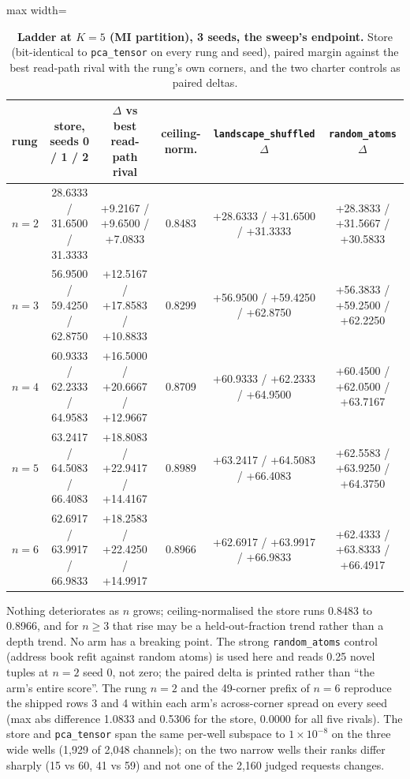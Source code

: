 \documentclass{article} %
\newcommand{\sci}[2]{\ensuremath{#1\times10^{#2}}}
\begin{document}
\begin{table}[h]
\centering\small
\caption{\textbf{Ladder at $K=5$ (MI partition), 3 seeds, the sweep's endpoint.} Store
(bit-identical to \texttt{pca\_tensor} on every rung and seed), paired margin against the best
read-path rival with the rung's own corners, and the two charter controls as paired deltas.}
\label{tab:k5}
\setlength{\tabcolsep}{2.4pt}
\begin{adjustbox}{max width=\linewidth}\begin{tabular}{lccccc}
\toprule
rung & store, seeds 0 / 1 / 2 & $\Delta$ vs best read-path rival & ceiling-norm. & \texttt{landscape\_shuffled} $\Delta$ & \texttt{random\_atoms} $\Delta$ \\
\midrule
$n=2$ & 28.6333 / 31.6500 / 31.3333 & +9.2167 / +9.6500 / +7.0833 & 0.8483 & +28.6333 / +31.6500 / +31.3333 & +28.3833 / +31.5667 / +30.5833 \\
$n=3$ & 56.9500 / 59.4250 / 62.8750 & +12.5167 / +17.8583 / +10.8833 & 0.8299 & +56.9500 / +59.4250 / +62.8750 & +56.3833 / +59.2500 / +62.2250 \\
$n=4$ & 60.9333 / 62.2333 / 64.9583 & +16.5000 / +20.6667 / +12.9667 & 0.8709 & +60.9333 / +62.2333 / +64.9500 & +60.4500 / +62.0500 / +63.7167 \\
$n=5$ & 63.2417 / 64.5083 / 66.4083 & +18.8083 / +22.9417 / +14.4167 & 0.8989 & +63.2417 / +64.5083 / +66.4083 & +62.5583 / +63.9250 / +64.3750 \\
$n=6$ & 62.6917 / 63.9917 / 66.9833 & +18.2583 / +22.4250 / +14.9917 & 0.8966 & +62.6917 / +63.9917 / +66.9833 & +62.4333 / +63.8333 / +66.4917 \\
\bottomrule
\end{tabular}\end{adjustbox}
\end{table}

\noindent Nothing deteriorates as $n$ grows; ceiling-normalised the store runs 0.8483 to 0.8966,
and for $n\ge3$ that rise may be a held-out-fraction trend rather than a depth trend. No arm has a
breaking point. The strong \texttt{random\_atoms} control (address book refit against random
atoms) is used here and reads 0.25 novel tuples at $n=2$ seed 0, not zero; the paired delta is
printed rather than ``the arm's entire score''. %
The rung $n=2$ and the 49-corner prefix of $n=6$ reproduce the shipped rows 3 and 4 within each
arm's across-corner spread on every seed (max abs difference 1.0833 and 0.5306 for the store, 0.0000
for all five rivals). %
The store and \texttt{pca\_tensor} span the same per-well subspace to \sci{1}{-8} on the three wide
wells (1,929 of 2,048 channels); on the two narrow wells their ranks differ sharply (15 vs 60, 41 vs
59) and not one of the 2,160 judged requests changes. %
\end{document}
